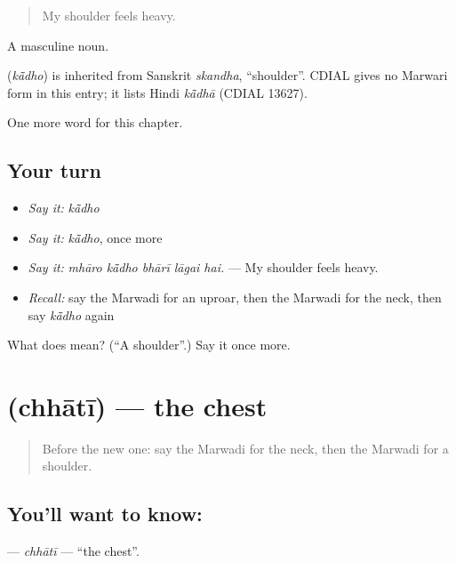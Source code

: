 \begin{quote}
My shoulder feels heavy.
\end{quote}

A masculine noun.

\begin{cousinweb}
\textbf{} (\emph{kā̃dho}) is inherited from Sanskrit \emph{skandha}, \textquotedblleft{}shoulder\textquotedblright{}. CDIAL gives no Marwari form in this entry; it lists Hindi \emph{kā̃dhā} (CDIAL 13627).
\end{cousinweb}

\begin{grammarlens}[title={What you've built}]
One more word for this chapter.
\end{grammarlens}

\subsection*{Your turn}
\begin{itemize}
\raggedright
  \item \emph{Say it:} \emph{kā̃dho}
  \item \emph{Say it:} \emph{kā̃dho}, once more
  \item \emph{Say it:} \emph{mhāro kā̃dho bhārī lāgai hai.} — My shoulder feels heavy.
  \item \emph{Recall:} say the Marwadi for an uproar, then the Marwadi for the neck, then say \emph{kā̃dho} again
\end{itemize}

\begin{tcolorbox}[breakable,colback=teal!4,colframe=teal!35!black,title={Before you move on}]
What does  mean? (\textquotedblleft{}A shoulder\textquotedblright{}.) Say it once more.
\end{tcolorbox}
\section[\texorpdfstring{\mw{छाती} (chhātī)}{छाती (chhātī)}]{ (chhātī) — the chest}

\label{lesson:MW-C251-chhati}



\begin{quote}
Before the new one: say the Marwadi for the neck, then the Marwadi for a shoulder.
\end{quote}

\subsection*{You'll want to know: }
\textbf{} — \emph{chhātī} — \textquotedblleft{}the chest\textquotedblright{}.

